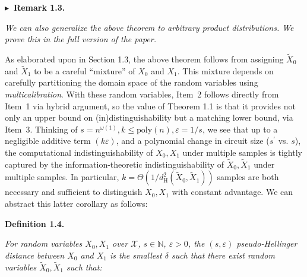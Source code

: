 



\par\medskip\noindent\textbf{
$\blacktriangleright$ Remark 1.3.
}\par



\emph{We can also generalize the above theorem to arbitrary product distributions. We prove this in the full version of the paper.}\par






As elaborated upon in Section 1.3, the above theorem follows from assigning $\widetilde{X}_{0}$ and $\widetilde{X}_{1}$ to be a careful “mixture” of $X_{0}$ and $X_{1}$. This mixture depends on carefully partitioning the domain space of the random variables using \emph{multicalibration}. With these random variables, Item 2 follows directly from Item 1 via hybrid argument, so the value of Theorem 1.1 is that it provides not only an upper bound on (in)distinguishability but a matching lower bound, via Item 3.
Thinking of $s=n^{\omega(1)},k\leq\mathrm{poly}(n),\varepsilon=1/s$, we see that up to a negligible additive term $(k\varepsilon)$, and a polynomial change in circuit size ($s^{\prime}$ vs. $s$), the computational indistinguishability of $X_{0},X_{1}$ under multiple samples is tightly captured by the information-theoretic indistinguishability of $\widetilde{X}_{0},\widetilde{X}_{1}$ under multiple samples. In particular, $k=\Theta\left(1/d^{2}_{\mathrm{H}}(\widetilde{X}_{0},\widetilde{X}_{1})\right)$ samples are both necessary and sufficient to distinguish $X_{0},X_{1}$ with constant advantage. We can abstract this latter corollary as follows:\par





\par\medskip\noindent\textbf{
\textbf{Definition 1.4}\textbf{.}
}\par



\emph{For random variables $X_{0},X_{1}$ over $\mathcal{X}$, $s\in\mathbb{N}$, $\varepsilon>0$, the $(s,\varepsilon)$ pseudo-Hellinger distance between $X_{0}$ and $X_{1}$ is the smallest $\delta$ such that there exist random variables $\widetilde{X}_{0},\widetilde{X}_{1}$ such that:}\par


